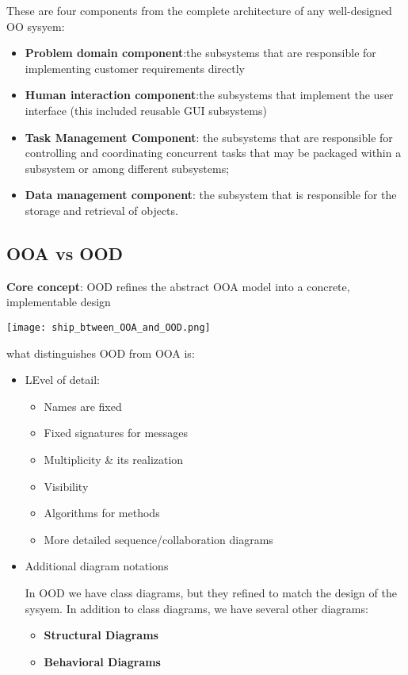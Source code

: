 These are four components from the complete architecture of any well-designed OO sysyem:
\begin{itemize}
    \item \textbf{Problem domain component}:the subsystems that are
responsible for implementing customer requirements
directly
    \item \textbf{Human interaction component}:the subsystems that implement the user interface (this included reusable GUI subsystems)
    \item \textbf{Task Management Component}: the subsystems that are responsible for controlling and coordinating concurrent tasks that may be packaged within a subsystem or among different subsystems;
    \item \textbf{Data management component}: the subsystem that is responsible for the storage and retrieval of objects.
\end{itemize}

\subsection{OOA vs OOD}
\textbf{Core concept}: OOD refines the abstract OOA model into a concrete, implementable design

\begin{center}
    \texttt{[image: ship\_btween\_OOA\_and\_OOD.png]}
\end{center}
what distinguishes OOD from OOA is:
\begin{itemize}
    \item LEvel of detail:
    \begin{itemize}
        \item Names are fixed
        \item Fixed signatures for messages
        \item Multiplicity \& its realization
        \item Visibility
        \item Algorithms for methods
        \item More detailed sequence/collaboration diagrams
    \end{itemize}
    \item Additional diagram notations
    
    In OOD we have class diagrams, but they refined to match the design of the sysyem.  In addition to class diagrams, we have several other diagrams:

    \begin{itemize}
        \item \textbf{Structural Diagrams}
        \item \textbf{Behavioral Diagrams}
    \end{itemize}
\end{itemize}
